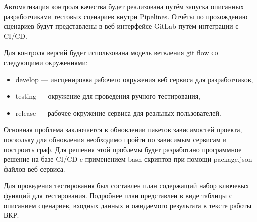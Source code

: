 Автоматизация контроля качества будет реализована путём запуска описанных разработчиками тестовых сценариев внутри Pipelines.
Отчёты по прохождению сценариев будут представлены в веб интерфейсе GitLab путём интеграции с CI/CD.

Для контроля версий будет использована модель ветвления git flow со следующими окружениями:

\begin{itemize}
    \item develop --- инсценировка рабочего окружения веб сервиса для разработчиков,
    \item testing --- окружение для проведения ручного тестирования,
    \item release --- рабочее окружение сервиса для реальных пользователей.
\end{itemize}

Основная проблема заключается в обновлении пакетов зависимостей проекта, поскольку для обновления необходимо пройти по зависимым сервисам и построить граф.
Для решения этой проблемы будет разработано программное решение на базе CI/CD c применением bash скриптов при помощи package.json файлов веб сервиса.

Для проведения тестирования был составлен план содержащий набор ключевых функций для тестирования.
Подробнее план представлен в виде таблицы с описанием сценариев, входных данных и ожидаемого результата в тексте работы ВКР.

